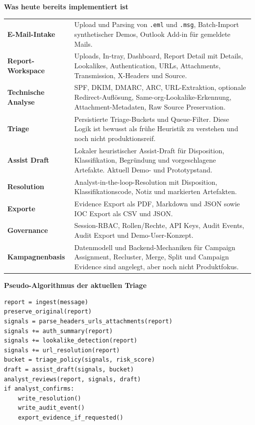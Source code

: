 \documentclass[10pt,a4paper]{article}
\begin{document}
\vspace{0.35em}
\noindent\textbf{Was heute bereits implementiert ist}\par\vspace{0.12em}
\noindent\begin{tabularx}{\textwidth}{@{}>{\bfseries}p{4.1cm}X@{}}
E-Mail-Intake & Upload und Parsing von \texttt{.eml} und \texttt{.msg}, Batch-Import synthetischer Demos, Outlook Add-in für gemeldete Mails.\\
Report-Workspace & Uploads, In-tray, Dashboard, Report Detail mit Details, Lookalikes, Authentication, URLs, Attachments, Transmission, X-Headers und Source.\\
Technische Analyse & SPF, DKIM, DMARC, ARC, URL-Extraktion, optionale Redirect-Auflösung, Same-org-Lookalike-Erkennung, Attachment-Metadaten, Raw Source Preservation.\\
Triage & Persistierte Triage-Buckets und Queue-Filter. Diese Logik ist bewusst als frühe Heuristik zu verstehen und noch nicht produktionsreif.\\
Assist Draft & Lokaler heuristischer Assist-Draft für Disposition, Klassifikation, Begründung und vorgeschlagene Artefakte. Aktuell Demo- und Prototypstand.\\
Resolution & Analyst-in-the-loop-Resolution mit Disposition, Klassifikationscode, Notiz und markierten Artefakten.\\
Exporte & Evidence Export als PDF, Markdown und JSON sowie IOC Export als CSV und JSON.\\
Governance & Session-RBAC, Rollen/Rechte, API Keys, Audit Events, Audit Export und Demo-User-Konzept.\\
Kampagnenbasis & Datenmodell und Backend-Mechaniken für Campaign Assignment, Recluster, Merge, Split und Campaign Evidence sind angelegt, aber noch nicht Produktfokus.\\
\end{tabularx}

\vspace{0.35em}
\noindent\textbf{Pseudo-Algorithmus der aktuellen Triage}
\begin{verbatim}
report = ingest(message)
preserve_original(report)
signals = parse_headers_urls_attachments(report)
signals += auth_summary(report)
signals += lookalike_detection(report)
signals += url_resolution(report)
bucket = triage_policy(signals, risk_score)
draft = assist_draft(signals, bucket)
analyst_reviews(report, signals, draft)
if analyst_confirms:
    write_resolution()
    write_audit_event()
    export_evidence_if_requested()
\end{verbatim}
\end{document}

